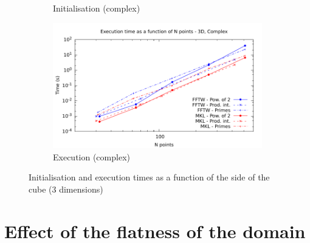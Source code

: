\documentclass[12pt, a4paper]{article} \setlength{\textheight}{24cm}
\begin{document}
\begin{figure}[H]
\begin{subfigure}{.5\textwidth}
    \caption{Initialisation (complex)}
    \label{3DCI}
  \end{subfigure}%
  \begin{subfigure}{.5\textwidth}
    \centering
    \includegraphics[width=.9\linewidth]{graphs/3d-exec-c.pdf}
    \caption{Execution (complex)}
    \label{3DC}
  \end{subfigure}
  \caption{Initialisation and execution times as a function of the
    side of the cube (3 dimensions)}
  \label{3D}
\end{figure}
\section{Effect of the flatness of the domain}\label{Sec:FLATNESS}
\end{document}

